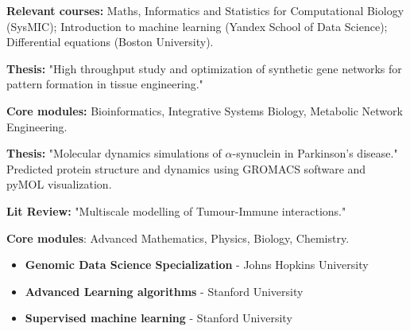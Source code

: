 \documentclass[10pt,a4paper,ragged2e,withhyper]{altacv}
\begin{document}
\begin{paracol}{2}
\divider

\textbf{Relevant courses:} Maths, Informatics and Statistics for Computational Biology (SysMIC); Introduction to machine learning (Yandex School of Data Science); Differential equations (Boston University). 

\vspace{0.2cm}

\textbf{Thesis:} "High throughput study and optimization of synthetic gene networks for pattern formation in tissue engineering."

\divider



\textbf{Core modules:} Bioinformatics, Integrative Systems Biology, Metabolic Network Engineering.
\vspace{0.2cm}

\textbf{Thesis:} "Molecular dynamics simulations of $\alpha$-synuclein in Parkinson's disease." Predicted protein structure and dynamics using GROMACS software and pyMOL visualization.  

\vspace{0.2cm}
\textbf{Lit Review:} "Multiscale modelling of Tumour-Immune interactions."


\vspace{-0.5\baselineskip} %
\divider

 \textbf{Core modules}: Advanced Mathematics, Physics, Biology, Chemistry.
 \medskip


\begin{itemize}
    \item \textbf{Genomic Data Science Specialization} - Johns Hopkins University
        \item \textbf{Advanced Learning algorithms} - Stanford University
        \item \textbf{Supervised machine learning} - Stanford University
\end{itemize}



\switchcolumn


\end{paracol}
\end{document}
